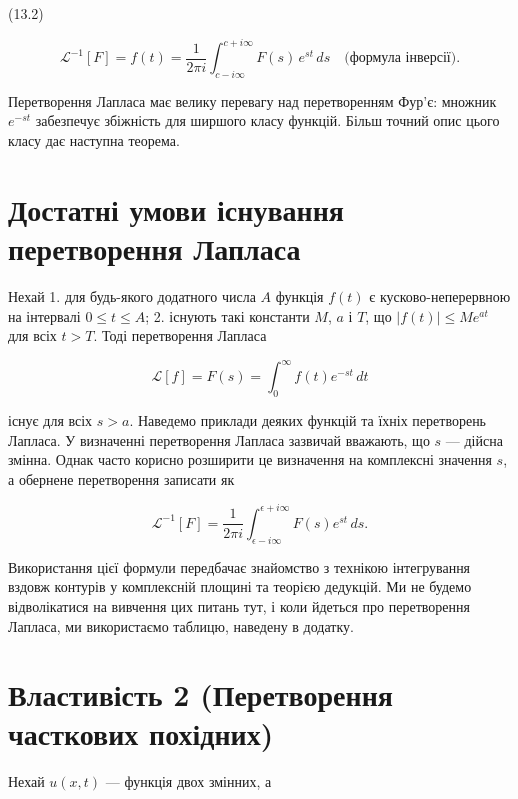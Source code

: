(13.2)

\[
\mathscr{L}^{-1}[F] = f(t) = \frac{1}{2\pi i} \int_{c-i\infty}^{c+i\infty} F(s) \, e^{st} \, ds
\quad \text{(формула інверсії).}
\]

Перетворення Лапласа має велику перевагу над перетворенням Фур'є: множник \(e^{-st}\) забезпечує збіжність для ширшого класу функцій. Більш точний опис цього класу дає наступна теорема.

\section{Достатні умови існування перетворення Лапласа}\label{ux434ux43eux441ux442ux430ux442ux43dux456-ux443ux43cux43eux432ux438-ux456ux441ux43dux443ux432ux430ux43dux43dux44f-ux43fux435ux440ux435ux442ux432ux43eux440ux435ux43dux43dux44f-ux43bux430ux43fux43bux430ux441ux430}

Нехай 1. для будь-якого додатного числа \(A\) функція \(f(t)\) є кусково-неперервною на інтервалі \(0 \le t \le A\); 2. існують такі константи \(M\), \(a\) і \(T\), що \(|f(t)| \le Me^{at}\) для всіх \(t > T\). Тоді перетворення Лапласа

\[
\mathscr{L}[f] = F(s) = \int_0^\infty f(t)e^{-st}\,dt
\]

існує для всіх \(s > a\). Наведемо приклади деяких функцій та їхніх перетворень Лапласа. У визначенні перетворення Лапласа зазвичай вважають, що \(s\) --- дійсна змінна. Однак часто корисно розширити це визначення на комплексні значення \(s\), а обернене перетворення записати як

\[
\mathscr{L}^{-1}[F] = \frac{1}{2\pi i} \int_{\epsilon - i\infty}^{\epsilon + i\infty} F(s)e^{st}\,ds.
\]

Використання цієї формули передбачає знайомство з технікою інтегрування вздовж контурів у комплексній площині та теорією дедукцій. Ми не будемо відволікатися на вивчення цих питань тут, і коли йдеться про перетворення Лапласа, ми використаємо таблицю, наведену в додатку.

\section{Властивість 2 (Перетворення часткових похідних)}\label{ux432ux43bux430ux441ux442ux438ux432ux456ux441ux442ux44c-2-ux43fux435ux440ux435ux442ux432ux43eux440ux435ux43dux43dux44f-ux447ux430ux441ux442ux43aux43eux432ux438ux445-ux43fux43eux445ux456ux434ux43dux438ux445}

Нехай \(u(x,t)\) --- функція двох змінних, а

